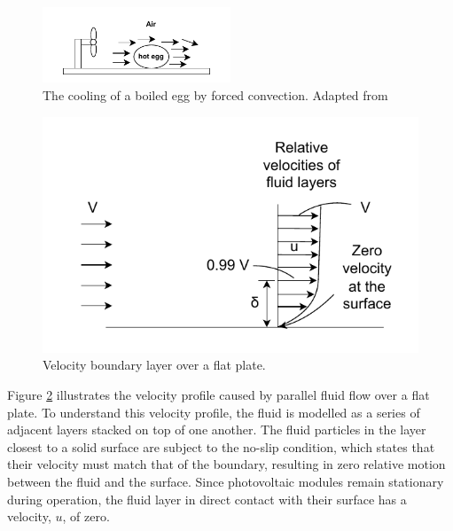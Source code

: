 
\begin{figure}[ht]
    \centering
    \includegraphics[width=0.5\textwidth]{Figures/cooling_of_boiled_egg_forced_convection.pdf}
    \caption{The cooling of a boiled egg by forced convection. Adapted from \cite{Cengel2014IntroductionConcepts}}
    \label{fig:cooling_of_boiled_egg_forced_convection}
\end{figure}

\begin{figure}[ht]
    \centering
    \includegraphics[width=0.75\linewidth]{Figures/velocity_boundary_layer.pdf}
    \caption{Velocity boundary layer over a flat plate. \cite{Cengel2014FundamentalsConvection}}
    \label{fig:velocity_boundary_layer}
\end{figure}

Figure \ref{fig:velocity_boundary_layer} illustrates the velocity profile caused by parallel fluid flow over a flat plate. To understand this velocity profile, the fluid is modelled as a series of adjacent layers stacked on top of one another. The fluid particles in the layer closest to a solid surface are subject to the no-slip condition, which states that their velocity must match that of the boundary, resulting in zero relative motion between the fluid and the surface. Since photovoltaic modules remain stationary during operation, the fluid layer in direct contact with their surface has a velocity, $u$, of zero.\vspace{0.5em}

